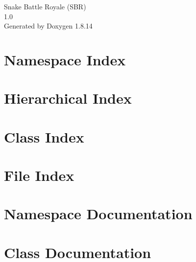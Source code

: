 \documentclass[twoside]{book}
\newcommand{\+}{\discretionary{\mbox{\scriptsize$\hookleftarrow$}}{}{}}
\newcommand{\clearemptydoublepage}{%
  \newpage{\pagestyle{empty}\cleardoublepage}%
}
\begin{document}
\hypersetup{pageanchor=false,
             bookmarksnumbered=true,
             pdfencoding=unicode
            }
\begin{titlepage}
\vspace*{7cm}
\begin{center}%
{\Large Snake Battle Royale (S\+BR) \\[1ex]\large 1.\+0 }\\
\vspace*{1cm}
{\large Generated by Doxygen 1.8.14}\\
\end{center}
\end{titlepage}
\clearemptydoublepage
{}
\tableofcontents
\clearemptydoublepage
{}
\hypersetup{pageanchor=true}

\chapter{Namespace Index}

\chapter{Hierarchical Index}

\chapter{Class Index}

\chapter{File Index}

\chapter{Namespace Documentation}




\chapter{Class Documentation}






















\end{document}
